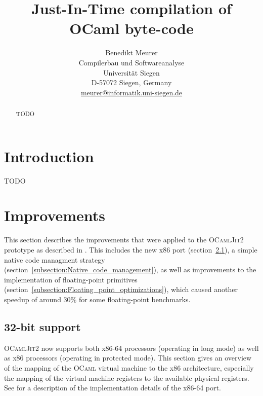 \documentclass[12pt,a4paper,final]{article}
\begin{document}
\title{%
  Just-In-Time compilation of OCaml byte-code
}
\author{%
  Benedikt Meurer\\
  Compilerbau und Softwareanalyse\\
  Universit\"at Siegen\\
  D-57072 Siegen, Germany\\
  \url{meurer@informatik.uni-siegen.de}
}
\date{}
\maketitle
\begin{abstract}
  TODO
\end{abstract}


\section{Introduction}

TODO


\section{Improvements} \label{section:Improvements}

This section describes the improvements that were applied to the \textsc{OCamlJit2} prototype
as described in \cite{Meurer10:OCamlJit2.0}. This
includes the new x86 port (section~\ref{subsection:32_bit_support}), a simple native code managment
strategy (section~\ref{subsection:Native_code_management}), as well as improvements
to the implementation of floating-point primitives (section~\ref{subsection:Floating_point_optimizations}),
which caused another speedup of around $30\%$ for some floating-point benchmarks.

\subsection{32-bit support} \label{subsection:32_bit_support}

\textsc{OCamlJit2} now supports both x86-64 processors (operating in long mode)
as well as x86 processors (operating in protected mode). This section gives an
overview of the mapping of the \textsc{OCaml} virtual machine to the x86
architecture, especially the mapping of the virtual machine registers to the available
physical registers. See \cite{Meurer10:OCamlJit2.0} for a description of the implementation
details of the x86-64 port.
\end{document}

